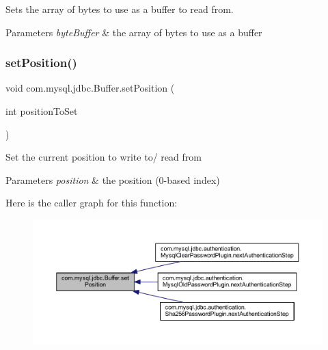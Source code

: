 Sets the array of bytes to use as a buffer to read from.


\begin{DoxyParams}{Parameters}
{\em byte\+Buffer} & the array of bytes to use as a buffer \\
\hline
\end{DoxyParams}
\mbox{\label{classcom_1_1mysql_1_1jdbc_1_1_buffer_a88b04735cd68d8d1772d176c3ac4542a}} 
\subsubsection{\texorpdfstring{set\+Position()}{setPosition()}}
{\footnotesize\ttfamily void com.\+mysql.\+jdbc.\+Buffer.\+set\+Position (\begin{DoxyParamCaption}\item[{int}]{position\+To\+Set }\end{DoxyParamCaption})}

Set the current position to write to/ read from


\begin{DoxyParams}{Parameters}
{\em position} & the position (0-\/based index) \\
\hline
\end{DoxyParams}
Here is the caller graph for this function\+:\nopagebreak
\begin{figure}[H]
\begin{center}
\leavevmode
\includegraphics[width=350pt]{classcom_1_1mysql_1_1jdbc_1_1_buffer_a88b04735cd68d8d1772d176c3ac4542a_icgraph}
\end{center}
\end{figure}
\mbox{\label{classcom_1_1mysql_1_1jdbc_1_1_buffer_a51b92498f9644d69555e3770986d3ad4}} 
